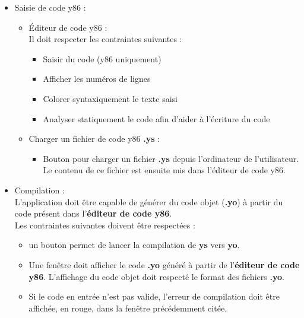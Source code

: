 \documentclass[french]{article}
\begin{document}
\begin{itemize}
    \item Saisie de code y86 :
    \begin{itemize}
        \item Éditeur de code y86 :\\
        Il doit respecter les contraintes suivantes :
        \begin{itemize}
            \item Saisir du code (y86 uniquement)
            \item Afficher les numéros de lignes
            \item Colorer syntaxiquement le texte saisi
            \item Analyser statiquement le code afin d'aider à l'écriture du code
        \end{itemize}{}
        \item Charger un fichier de code y86 \textbf{.ys} :
        \begin{itemize}
            \item Bouton pour charger un fichier \textbf{.ys} depuis l'ordinateur de l'utilisateur. Le contenu de ce fichier est ensuite mis dans l'éditeur de code y86.
        \end{itemize}{}
    \end{itemize}{}
    
    \item Compilation :\\
    L'application doit être capable de générer du code objet (\textbf{.yo}) à partir du code présent dans l'\textbf{éditeur de code y86}.\\
    Les contraintes suivantes doivent être respectées :
    \begin{itemize}
        \item un bouton permet de lancer la compilation de \textbf{ys} vers \textbf{yo}.
        \item Une fenêtre doit afficher le code \textbf{.yo} généré à partir de l'\textbf{éditeur de code y86}. L'affichage du code objet doit respecté le format des fichiers \textbf{.yo}.
        \item Si le code en entrée n'est pas valide, l'erreur de compilation doit être affichée, en rouge, dans la fenêtre précédemment citée.
    \end{itemize}{}
    

\end{itemize}
\end{document}
